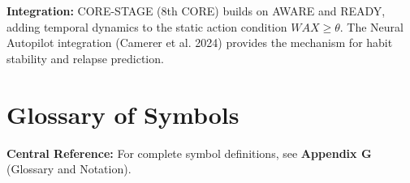 \begin{tcolorbox}[colback=green!10!white, colframe=green!75!black,
    title=\textbf{Appendix AW: Summary}]
\textbf{Integration:} CORE-STAGE (8th CORE) builds on AWARE and READY, adding temporal dynamics to the static action condition $WAX \geq \theta$. The Neural Autopilot integration (Camerer et al. 2024) provides the mechanism for habit stability and relapse prediction.

\end{tcolorbox}



\section{Glossary of Symbols}
\label{sec:bcj-glossary}

\begin{tcolorbox}[colback=blue!5!white, colframe=blue!75!black]
\textbf{Central Reference:} For complete symbol definitions, see \textbf{Appendix G} (Glossary and Notation).
\end{tcolorbox}

